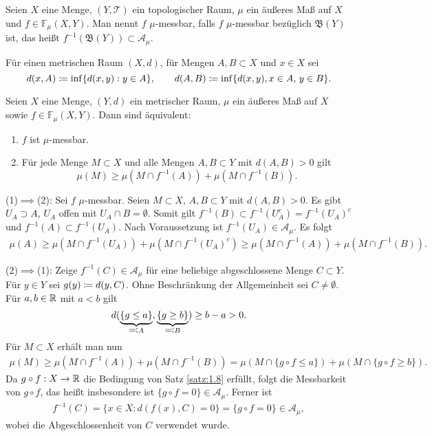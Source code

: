 \documentclass[a4paper,twoside,DIV15,BCOR12mm]{scrbook}
\newcommand{\A}{\mathcal A}
\newcommand{\borel}{\mathfrak B}
\begin{document}
\begin{definition}
Seien $X$ eine Menge, $(Y,\mathcal T)$ ein topologischer Raum, $\mu$ ein äußeres Maß auf $X$ und $f\in\mathbb F_\mu(X,Y)$. Man nennt $f$ $\mu$-messbar, falls $f$ $\mu$-messbar bezüglich $\borel(Y)$ ist, das heißt $f^{-1}(\borel(Y))\subset \A_\mu$.
\end{definition}

Für einen metrischen Raum $(X,d)$, für Mengen $A,B\subset X$ und $x\in X$ sei 
$$
d(x,A) \da \inf\{d(x,y): y\in A\},\qquad d(A,B)\da \inf\{d(x,y),x\in A,\, y\in B\}.
$$

\begin{satz}
\label{satz:2.3}
Seien $X$ eine Menge, $(Y,d)$ ein metrischer Raum, $\mu$ ein äußeres Maß auf $X$ sowie $f\in\mathbb F_\mu(X,Y)$. Dann sind äquivalent:
\begin{enumerate}
\item $f$ ist $\mu$-messbar.
\item Für jede Menge $M\subset X$ und alle Mengen $A,B\subset Y$ mit $d(A,B)>0$ gilt
\[
\mu(M) \ge \mu(M\cap f^{-1}(A)) + \mu(M \cap f^{-1}(B)).
\]
\end{enumerate}
\end{satz}

\begin{beweis}
(1)$\implies$(2): Sei $f$ $\mu$-messbar. Seien $M\subset X$, $A,B\subset Y$ mit $d(A,B)>0$. Es gibt $U_A\supset A$, $U_A$ offen mit $U_A\cap B=\emptyset$. Somit gilt $f^{-1}(B) \subset f^{-1}(U_A^c) = f^{-1}(U_A)^c$ und $f^{-1}(A)\subset f^{-1}(U_A)$. Nach Voraussetzung ist $f^{-1}(U_A)\in\A_\mu$. Es folgt
\begin{align*}
\mu(A) \ge \mu(M\cap f^{-1}(U_A)) + \mu (M\cap f^{-1}(U_A)^c)
\ge \mu(M\cap f^{-1}(A)) + \mu(M\cap f^{-1}(B)).
\end{align*}

(2)$\implies$(1): Zeige $f^{-1}(C) \in \A_\mu$ für eine beliebige abgeschlossene Menge $C\subset Y$. Für $y\in Y$ sei $g(y) \da d(y,C)$. Ohne Beschränkung der Allgemeinheit sei $C\ne \emptyset$. Für $a,b\in \mathbb{R}$ mit $a<b$ gilt 
\[
d(\underbrace{\{g\le a\}}_{\ad A}, \underbrace{\{g\ge b\}}_{\ad B})  \ge b - a > 0.
\]
Für $M\subset X$ erhält man nun
\begin{align*}
\mu(M) \ge \mu(M\cap f^{-1}(A)) + \mu(M\cap f^{-1}(B)) 
= \mu(M \cap \{g\circ f\le a\}) + \mu(M\cap \{g\circ f \ge b\}).
\end{align*}
Da $g\circ f : X\to \mathbb{R}$ die Bedingung von Satz \ref{satz:1.8} erfüllt, folgt die Messbarkeit von $g\circ f$, das heißt insbesondere ist $\{g \circ f = 0\}\in \A_\mu$. Ferner ist 
\begin{align*}
f^{-1}(C) = \{x\in X: d(f(x),C)=0\} = \{g\circ f= 0\} \in \A_\mu,
\end{align*}
wobei die Abgeschlossenheit von $C$ verwendet wurde.
\end{beweis}
\end{document}
